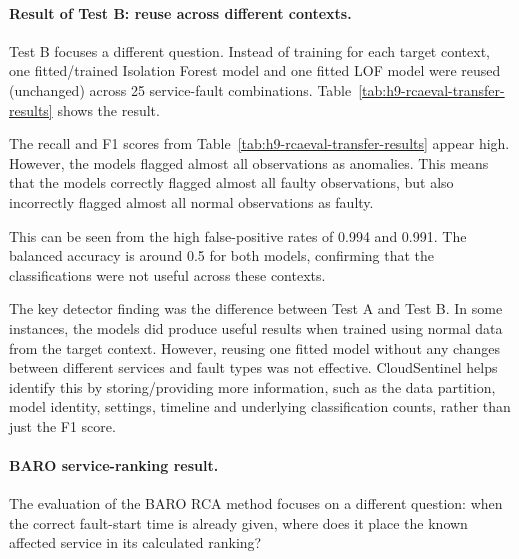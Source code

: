 \paragraph{Result of Test B: reuse across different contexts.}
Test B focuses a different question. Instead of training for each target context, one fitted/trained Isolation Forest model and one fitted LOF model were reused (unchanged) across 25 service-fault combinations. Table~\ref{tab:h9-rcaeval-transfer-results} shows the result.

\begin{table}[H]
    \centering
    \scriptsize
    \caption{Cross-context transfer stress test across 25 Train Ticket cases.}
    \label{tab:h9-rcaeval-transfer-results}
\end{table}

The recall and F1 scores from Table~\ref{tab:h9-rcaeval-transfer-results} appear high. However, the models flagged almost all observations as anomalies. This means that the models correctly flagged almost all faulty observations, but also incorrectly flagged almost all normal observations as faulty. 

This can be seen from the high false-positive rates of 0.994 and 0.991. The balanced accuracy is around 0.5 for both models, confirming that the classifications were not useful across these contexts. 

The key detector finding was the difference between Test A and Test B. In some instances, the models did produce useful results when trained using normal data from the target context. However, reusing one fitted model without any changes between different services and fault types was not effective. CloudSentinel helps identify this by storing/providing more information, such as the data partition, model identity, settings, timeline and underlying classification counts, rather than just the F1 score.

\paragraph{BARO service-ranking result.}
The evaluation of the BARO RCA method focuses on a different question: when the correct fault-start time is already given, where does it place the known affected service in its calculated ranking?


